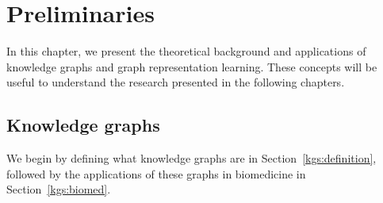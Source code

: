 \chapter{Preliminaries}\label{preliminaries}
In this chapter, we present the theoretical background and applications of knowledge graphs and graph representation learning. These concepts will be useful to understand the research presented in the following chapters.

\section{Knowledge graphs}\label{prel:kgs}
We begin by defining what knowledge graphs are in Section~\ref{kgs:definition}, followed by the applications of these graphs in biomedicine in Section~\ref{kgs:biomed}.


